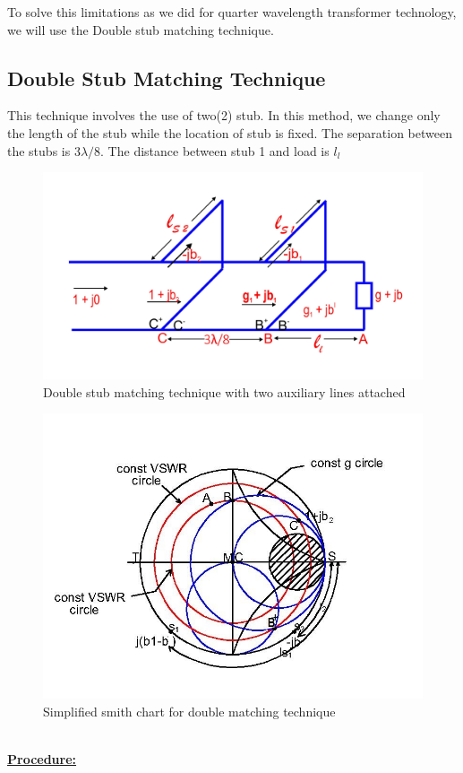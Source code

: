 To solve this limitations as we did for quarter wavelength transformer technology, we will use the Double stub matching technique.
\subsection{Double Stub Matching Technique}

This technique involves the use of two(2) stub. In this method, we change only the length of the stub while the location of stub is fixed. The separation between the stubs is $ 3\lambda/8$. The distance between stub 1 and load is $l_l$%
\begin{figure}[h]
\centering
\includegraphics[width=1\linewidth]{./graphics/fig12}
\caption{Double stub matching technique with two auxiliary lines attached}
\end{figure}
\begin{figure}[h]
\centering
\includegraphics[width=1\linewidth]{./graphics/dousmith}
\caption{Simplified smith chart for double matching technique}
\end{figure}\\
\underline{\textbf{Procedure:} } \\

